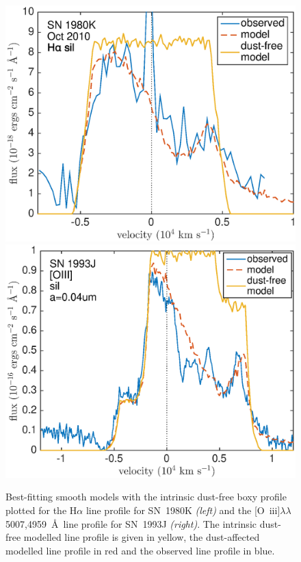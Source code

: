 \begin{figure}
\centering
\includegraphics[clip=true,scale=0.42,trim= 20 0 50 0]{chapters/chapter6/figs/80K/smooth/Ha_with_dust_free}
\includegraphics[clip=true,scale=0.42,trim= 17 0 50 0]{chapters/chapter6/figs/93J/smooth/OIII_with_dust_free}
\caption{Best-fitting smooth models with the intrinsic dust-free boxy profile plotted for the H$\alpha$ line profile for SN~1980K {\em (left)} and the [O~{\sc iii}]$\lambda\lambda$5007,4959~\AA\ line profile for SN~1993J {\em (right)}.  The intrinsic dust-free modelled line profile is given in yellow, the dust-affected modelled line profile in red and the observed line profile in blue.}
\label{boxy}
\end{figure}

